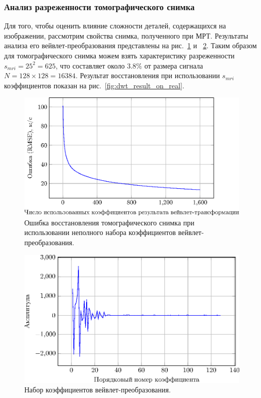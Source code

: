 \documentclass[14pt]{matmex-diploma-custom}
\begin{document}
\subsubsection*{Анализ разреженности томографического снимка} 

Для того, чтобы оценить влияние сложности деталей, содержащихся на изображении, рассмотрим свойства снимка, полученного при МРТ. Результаты анализа его вейвлет-преобразования представлены на рис.~\ref{fig:used_coef_mri} и ~\ref{fig:used_coef_mri2}. Таким образом для томографического снимка можем взять характеристику разреженности $s_{mri} = 25^2 = 625$, что составляет около  $3.8\%$ от размера сигнала $N=128\times 128=16384$. Результат восстановления при использовании $s_{mri}$ коэффициентов показан на рис.~\ref{fig:dwt_result_on_real}.

\begin{figure}[h]
    \centering
    \includegraphics[width=0.8\linewidth]{pics_eps/rmse_coef_in_use_real-img.eps}
    \caption{\small Ошибка восстановления томографического снимка при использовании неполного набора коэффициентов вейвлет-преобразования.}
    \label{fig:used_coef_mri}
\end{figure}
\begin{figure}[h]
    \centering
    \includegraphics[width=0.8\linewidth]{pics_eps/line_coefs_sparse_real-img.eps}
    \caption{\small Набор коэффициентов вейвлет-преобразования.}
    \label{fig:used_coef_mri2}
\end{figure}
\end{document}
